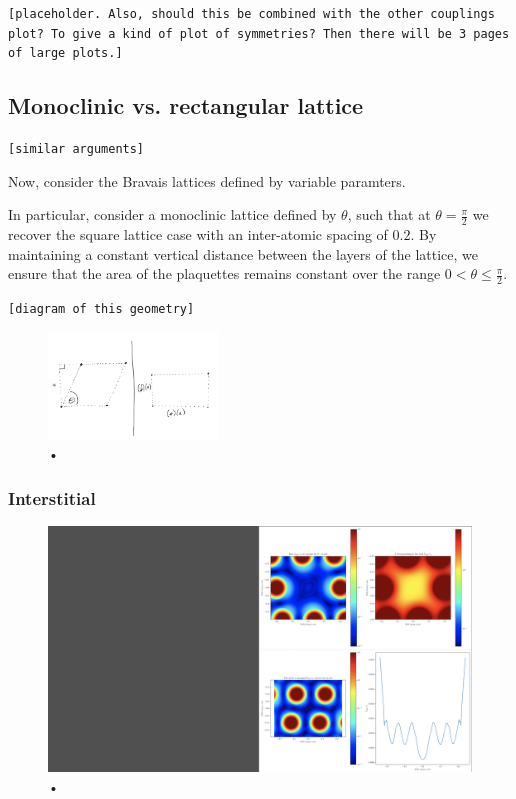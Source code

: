 \documentclass[aps,pra,superscriptaddress,twocolumn]{revtex4-1}
\newcommand{\commentSB}[1]{\texttt{\color{blue}[#1]}}
\newcommand{\commentSO}[1]{\texttt{\color{orange}[#1]}}
\begin{document}
\commentSB{placeholder. Also, should this be combined with the other couplings plot? To give a kind of plot of symmetries? Then there will be 3 pages of large plots.}

\subsection{Monoclinic vs. rectangular lattice}
\commentSO{similar arguments}

Now, consider the Bravais lattices defined by variable paramters. 

In particular, consider a monoclinic lattice defined by $\theta$, such that at $\theta = \frac{\pi}{2}$ we recover the square lattice case with an inter-atomic spacing of $0.2$. By maintaining a constant vertical distance between the layers of the lattice, we ensure that the area of the plaquettes remains constant over the range $ 0 < \theta \leq \frac{\pi}{2}$. 

\commentSB{diagram of this geometry}

\begin{figure}
    \centering
    \includegraphics[width=0.4\textwidth]{figures/mono_rect_geo.png} 
    \caption{•}
    \label{fig:mono_rect_geo}
\end{figure}

\subsubsection{Interstitial}

\begin{figure}
    \centering
    \includegraphics[width=1.0\textwidth]{figures/mono_rect_plaquettes_interstitial.png} 
    \caption{•}
    \label{fig:mono_rect_plaquette_interstitial}
\end{figure}
\end{document}
